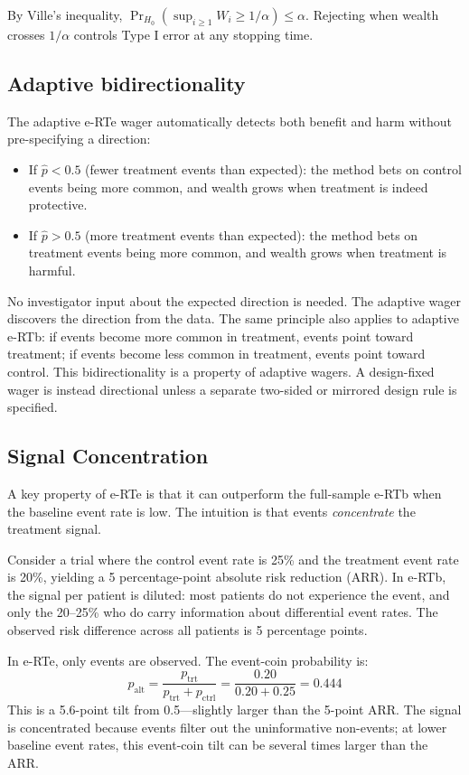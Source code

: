 \documentclass[10pt]{article}
\begin{document}
By Ville's inequality, $\Pr_{H_0}(\sup_{i \geq 1} W_i \geq 1/\alpha) \leq \alpha$. Rejecting when wealth crosses $1/\alpha$ controls Type I error at any stopping time.

\subsection{Adaptive bidirectionality}

The adaptive e-RTe wager automatically detects both benefit and harm without pre-specifying a direction:
\begin{itemize}
    \item If $\hat{p} < 0.5$ (fewer treatment events than expected): the method bets on control events being more common, and wealth grows when treatment is indeed protective.
    \item If $\hat{p} > 0.5$ (more treatment events than expected): the method bets on treatment events being more common, and wealth grows when treatment is harmful.
\end{itemize}

No investigator input about the expected direction is needed. The adaptive wager discovers the direction from the data. The same principle also applies to adaptive e-RTb: if events become more common in treatment, events point toward treatment; if events become less common in treatment, events point toward control. This bidirectionality is a property of adaptive wagers. A design-fixed wager is instead directional unless a separate two-sided or mirrored design rule is specified.

\subsection{Signal Concentration}

A key property of e-RTe is that it can outperform the full-sample e-RTb when the baseline event rate is low. The intuition is that events \emph{concentrate} the treatment signal.

Consider a trial where the control event rate is 25\% and the treatment event rate is 20\%, yielding a 5 percentage-point absolute risk reduction (ARR). In e-RTb, the signal per patient is diluted: most patients do not experience the event, and only the 20--25\% who do carry information about differential event rates. The observed risk difference across all patients is 5 percentage points.

In e-RTe, only events are observed. The event-coin probability is:
\begin{equation}
p_{\text{alt}} = \frac{p_{\text{trt}}}{p_{\text{trt}} + p_{\text{ctrl}}} = \frac{0.20}{0.20 + 0.25} = 0.444
\end{equation}
This is a 5.6-point tilt from 0.5---slightly larger than the 5-point ARR. The signal is concentrated because events filter out the uninformative non-events; at lower baseline event rates, this event-coin tilt can be several times larger than the ARR.
\end{document}
